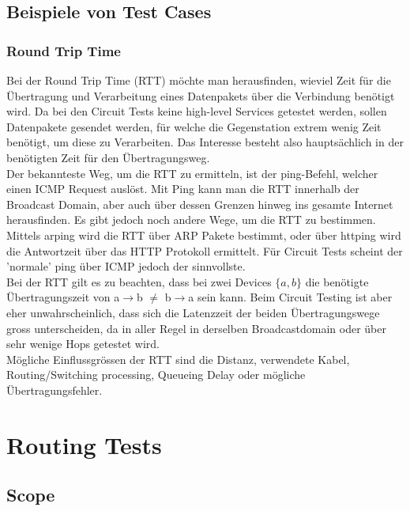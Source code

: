 \documentclass[a4,12pt]{scrartcl}
\begin{document}
\subsection{Beispiele von Test Cases}
\subsubsection{Round Trip Time}
Bei der Round Trip Time (RTT) möchte man herausfinden, wieviel Zeit für die Übertragung und Verarbeitung eines Datenpakets über die Verbindung benötigt wird. Da bei den Circuit Tests keine high-level Services getestet werden, sollen Datenpakete gesendet werden, für welche die Gegenstation extrem wenig Zeit benötigt, um diese zu Verarbeiten. Das Interesse besteht also hauptsächlich in der benötigten Zeit für den Übertragungsweg.\\

\noindent Der bekannteste Weg, um die RTT zu ermitteln, ist der ping-Befehl, welcher einen ICMP Request auslöst. Mit Ping kann man die RTT innerhalb der Broadcast Domain, aber auch über dessen Grenzen hinweg ins gesamte Internet herausfinden. Es gibt jedoch noch andere Wege, um die RTT zu bestimmen. Mittels arping wird die RTT über ARP Pakete bestimmt, oder über httping wird die Antwortzeit über das HTTP Protokoll ermittelt. Für Circuit Tests scheint der 'normale' ping über ICMP jedoch der sinnvollste.\\

\noindent Bei der RTT gilt es zu beachten, dass bei zwei Devices $\{a,b\}$ die benötigte Übertragungszeit von a$\rightarrow$b $\neq$ b$\rightarrow$a sein kann. Beim Circuit Testing ist aber eher unwahrscheinlich, dass sich die Latenzzeit der beiden Übertragungswege gross unterscheiden, da in aller Regel in derselben Broadcastdomain oder über sehr wenige Hops getestet wird.\\

\noindent Mögliche Einflussgrössen der RTT sind die Distanz, verwendete Kabel, Routing/Switching processing, Queueing Delay oder mögliche Übertragungsfehler.
\subsubsection{}  
\section{Routing Tests}
\subsection{Scope}
\end{document}
